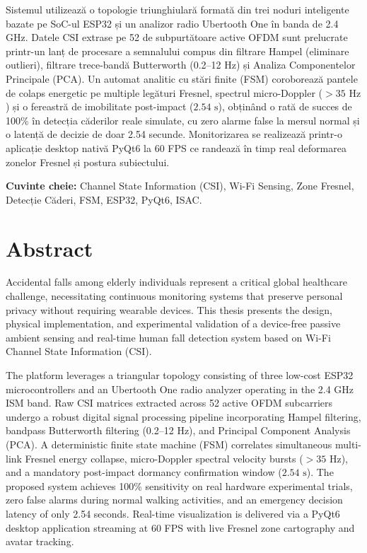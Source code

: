\documentclass[12pt,a4paper,oneside]{report}
\begin{document}
Sistemul utilizează o topologie triunghiulară formată din trei noduri inteligente bazate pe SoC-ul ESP32 și un analizor radio Ubertooth One în banda de 2.4 GHz. Datele CSI extrase pe 52 de subpurtătoare active OFDM sunt prelucrate printr-un lanț de procesare a semnalului compus din filtrare Hampel (eliminare outlieri), filtrare trece-bandă Butterworth (0.2--12 Hz) și Analiza Componentelor Principale (PCA). Un automat analitic cu stări finite (FSM) coroborează pantele de colaps energetic pe multiple legături Fresnel, spectrul micro-Doppler ($>35\text{ Hz}$) și o fereastră de imobilitate post-impact ($2.54\text{ s}$), obținând o rată de succes de 100\% în detecția căderilor reale simulate, cu zero alarme false la mersul normal și o latență de decizie de doar 2.54 secunde. Monitorizarea se realizează printr-o aplicație desktop nativă PyQt6 la 60 FPS ce randează în timp real deformarea zonelor Fresnel și postura subiectului.

\vspace{0.8cm}
\textbf{Cuvinte cheie:} Channel State Information (CSI), Wi-Fi Sensing, Zone Fresnel, Detecție Căderi, FSM, ESP32, PyQt6, ISAC.

\newpage

\chapter*{Abstract}
Accidental falls among elderly individuals represent a critical global healthcare challenge, necessitating continuous monitoring systems that preserve personal privacy without requiring wearable devices. This thesis presents the design, physical implementation, and experimental validation of a device-free passive ambient sensing and real-time human fall detection system based on Wi-Fi Channel State Information (CSI).

The platform leverages a triangular topology consisting of three low-cost ESP32 microcontrollers and an Ubertooth One radio analyzer operating in the 2.4 GHz ISM band. Raw CSI matrices extracted across 52 active OFDM subcarriers undergo a robust digital signal processing pipeline incorporating Hampel filtering, bandpass Butterworth filtering (0.2--12 Hz), and Principal Component Analysis (PCA). A deterministic finite state machine (FSM) correlates simultaneous multi-link Fresnel energy collapse, micro-Doppler spectral velocity bursts ($>35\text{ Hz}$), and a mandatory post-impact dormancy confirmation window ($2.54\text{ s}$). The proposed system achieves 100\% sensitivity on real hardware experimental trials, zero false alarms during normal walking activities, and an emergency decision latency of only 2.54 seconds. Real-time visualization is delivered via a PyQt6 desktop application streaming at 60 FPS with live Fresnel zone cartography and avatar tracking.
\end{document}
